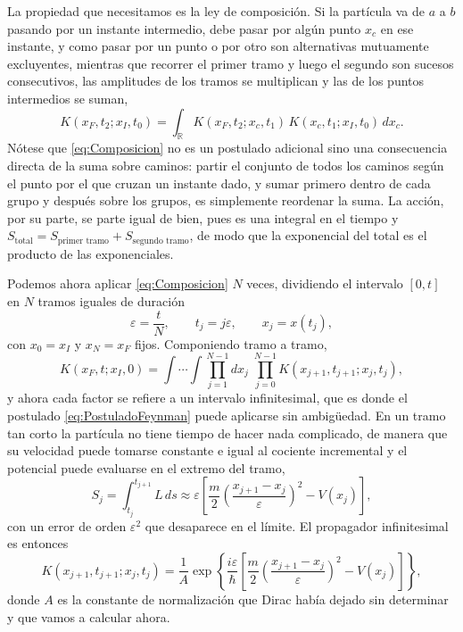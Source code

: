         La propiedad que necesitamos es la ley de composición. Si la partícula va de $a$ a $b$ pasando por un instante intermedio, debe pasar por algún punto $x_{c}$ en ese instante, y como pasar por un punto o por otro son alternativas mutuamente excluyentes, mientras que recorrer el primer tramo y luego el segundo son sucesos consecutivos, las amplitudes de los tramos se multiplican y las de los puntos intermedios se suman,
        \begin{equation}\label{eq:Composicion}
            K(x_{F},t_{2};x_{I},t_{0}) = \int_{\mathbb{R}} K(x_{F},t_{2};x_{c},t_{1})\,K(x_{c},t_{1};x_{I},t_{0})\,dx_{c} .
        \end{equation}
        Nótese que \eqref{eq:Composicion} no es un postulado adicional sino una consecuencia directa de la suma sobre caminos: partir el conjunto de todos los caminos según el punto por el que cruzan un instante dado, y sumar primero dentro de cada grupo y después sobre los grupos, es simplemente reordenar la suma. La acción, por su parte, se parte igual de bien, pues es una integral en el tiempo y $S_{\text{total}} = S_{\text{primer tramo}} + S_{\text{segundo tramo}}$, de modo que la exponencial del total es el producto de las exponenciales.

        Podemos ahora aplicar \eqref{eq:Composicion} $N$ veces, dividiendo el intervalo $[0,t]$ en $N$ tramos iguales de duración
        \begin{equation}\label{eq:Epsilon}
            \varepsilon = \frac{t}{N},
            \qquad
            t_{j} = j\varepsilon,
            \qquad
            x_{j} = x(t_{j}),
        \end{equation}
        con $x_{0}=x_{I}$ y $x_{N}=x_{F}$ fijos. Componiendo tramo a tramo,
        \begin{equation}\label{eq:Rodajas}
            K(x_{F},t;x_{I},0) = \int\cdots\int \prod_{j=1}^{N-1}dx_{j}\;\prod_{j=0}^{N-1} K\left(x_{j+1},t_{j+1};x_{j},t_{j}\right),
        \end{equation}
        y ahora cada factor se refiere a un intervalo infinitesimal, que es donde el postulado \eqref{eq:PostuladoFeynman} puede aplicarse sin ambigüedad. En un tramo tan corto la partícula no tiene tiempo de hacer nada complicado, de manera que su velocidad puede tomarse constante e igual al cociente incremental y el potencial puede evaluarse en el extremo del tramo,
        \begin{equation}\label{eq:AccionTramo}
            S_{j} = \int_{t_{j}}^{t_{j+1}} L\,ds \approx \varepsilon\left[\frac{m}{2}\left(\frac{x_{j+1}-x_{j}}{\varepsilon}\right)^{2} - V(x_{j})\right],
        \end{equation}
        con un error de orden $\varepsilon^{2}$ que desaparece en el límite. El propagador infinitesimal es entonces
        \begin{equation}\label{eq:NucleoCorto}
            K\left(x_{j+1},t_{j+1};x_{j},t_{j}\right) = \frac{1}{A}\exp\left\{\frac{i\varepsilon}{\hbar}\left[\frac{m}{2}\left(\frac{x_{j+1}-x_{j}}{\varepsilon}\right)^{2} - V(x_{j})\right]\right\},
        \end{equation}
        donde $A$ es la constante de normalización que Dirac había dejado sin determinar y que vamos a calcular ahora.

